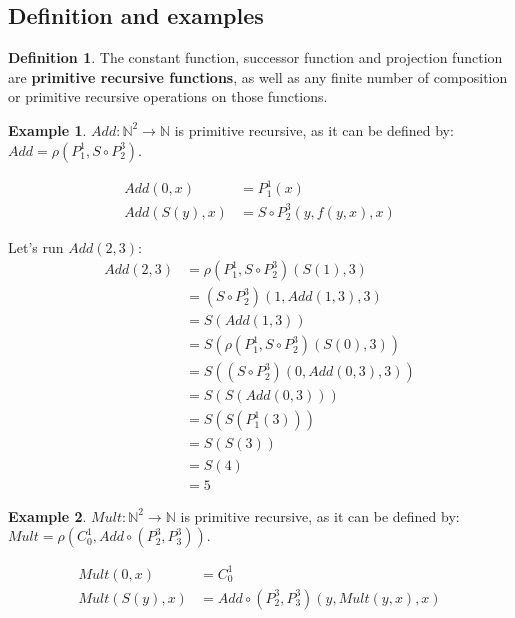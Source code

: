 \documentclass[11pt]{article}
\theoremstyle{plain}
\theoremstyle{definition}
\newtheorem*{defn}{Definition}
\newtheorem*{ex}{Example}
\newcommand{\N}{\mathbb{N}}
\begin{document}
\subsection{Definition and examples}

\begin{defn}
	The constant function, successor function and projection function are {\bf primitive recursive functions}, as well as
	any finite number of composition or primitive recursive operations on those functions.
\end{defn}

\begin{ex}
    $Add: \N^2 \rightarrow \N$ is primitive recursive, as it can be defined by:
    $Add = \rho(P^1_1, S \circ P^3_2)$.

    \begin{align*}
        Add(0, x) &= P^1_1(x) \\
        Add(S(y), x) &= S \circ P^3_2(y, f(y, x), x)
    \end{align*}

    Let's run $Add(2, 3)$:
    \begin{align*}
        Add(2, 3) &= \rho(P^1_1, S\circ P^3_2)(S(1), 3) \\
                  &= (S\circ P^3_2)(1, Add(1, 3), 3)\\
                  &= S(Add(1, 3))\\
                  &= S(\rho(P^1_1, S\circ P^3_2)(S(0), 3))\\
                  &= S((S\circ P^3_2)(0, Add(0, 3), 3))\\
                  &= S(S(Add(0, 3)))\\
                  &= S(S(P^1_1(3)))\\
                  &= S(S(3))\\
                  &= S(4)\\
                  &= 5
    \end{align*}
\end{ex}

\begin{ex}
    $Mult: \N^2 \rightarrow \N$ is primitive recursive, as it can be defined by:
    $Mult = \rho(C^1_0, Add \circ (P^3_2, P^3_3))$.

    \begin{align*}
        Mult(0, x) &= C^1_0 \\
        Mult(S(y), x) &= Add \circ (P^3_2, P^3_3)(y, Mult(y, x), x)
    \end{align*}
\end{ex}
\end{document}
